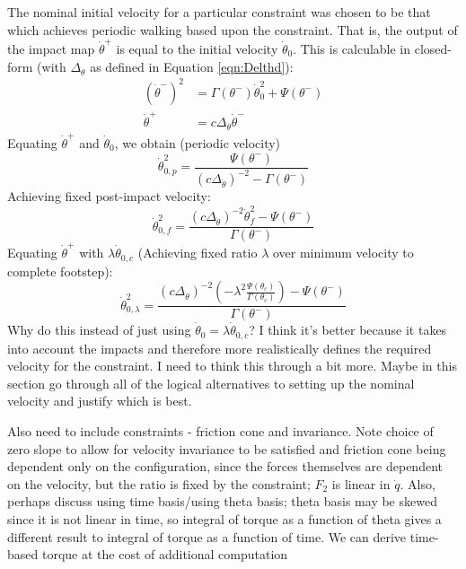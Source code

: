 The nominal initial velocity for a particular constraint was chosen to be that which achieves periodic walking based upon the constraint. That is, the output of the impact map $\dot{\theta}^+$ is equal to the initial velocity $\dot{\theta}_0$. This is calculable in closed-form (with $\Delta_{\dot{\theta}}$ as defined in Equation \ref{eqn:Delthd}):
\begin{subequations}
\begin{align}
	\left(\dot{\theta}^-\right)^2 &= \Gamma(\theta^-)\dot{\theta}_0^2 + \Psi(\theta^-) \\
	\dot{\theta}^+ &= c\Delta_{\dot{\theta}}\dot{\theta}^-
\end{align}
\end{subequations}
Equating $\dot{\theta}^+$ and $\dot{\theta}_0$, we obtain (periodic velocity)
\begin{equation}
	\dot{\theta}_{0,p}^2 = \frac{\Psi(\theta^-)}{(c\Delta_{\dot{\theta}})^{-2} - \Gamma(\theta^-)}
\end{equation}
Achieving fixed post-impact velocity:
\begin{equation}
	\dot{\theta}_{0,f}^2 = \frac{(c\Delta_{\dot{\theta}})^{-2}\dot{\theta}_f^2 - \Psi(\theta^-)} {\Gamma(\theta^-)}
\end{equation}
Equating $\dot{\theta}^+$ with $\lambda\dot{\theta}_{0,c}$ (Achieving fixed ratio $\lambda$ over minimum velocity to complete footstep):
\begin{equation}
	\dot{\theta}_{0,\lambda}^2 = \frac{(c\Delta_{\dot{\theta}})^{-2}\left(-\lambda^2\frac{ \Psi(\theta_c)}{ \Gamma(\theta_c)}\right) - \Psi(\theta^-)} {\Gamma(\theta^-)}
\end{equation}
{\color{blue} Why do this instead of just using $\dot{\theta}_0 = \lambda\dot{\theta}_{0,c}$? I think it's better because it takes into account the impacts and therefore more realistically defines the required velocity for the constraint. I need to think this through a bit more. Maybe in this section go through all of the logical alternatives to setting up the nominal velocity and justify which is best.}

{\color{red} Also need to include constraints - friction cone and invariance. Note choice of zero slope to allow for velocity invariance to be satisfied and friction cone being dependent only on the configuration, since the forces themselves are dependent on the velocity, but the ratio is fixed by the constraint; $F_2$ is linear in $\dot{q}$. Also, perhaps discuss using time basis/using theta basis; theta basis may be skewed since it is not linear in time, so integral of torque as a function of theta gives a different result to integral of torque as a function of time. We can derive time-based torque at the cost of additional computation}